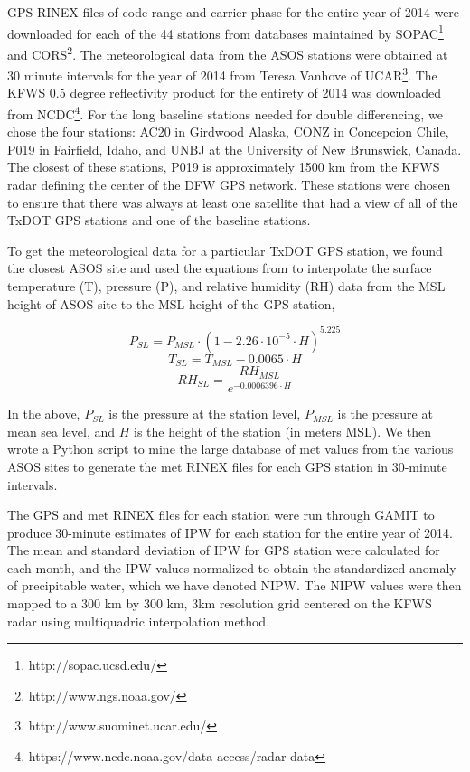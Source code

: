 \documentclass[proposal]{umassthesis}
\begin{document}
GPS RINEX files of code range and carrier phase for the entire year of 2014 were downloaded for each of the 44 stations from databases maintained by SOPAC\footnote{http://sopac.ucsd.edu/} \cite{bock1997scripps} and CORS\footnote{http://www.ngs.noaa.gov/}\cite{snay2008continuously}. The meteorological data from the ASOS stations were obtained at 30 minute intervals for the year of 2014 from Teresa Vanhove of UCAR\footnote{http://www.suominet.ucar.edu/}. The KFWS 0.5 degree reflectivity product for the entirety of 2014 was downloaded from NCDC\footnote{https://www.ncdc.noaa.gov/data-access/radar-data}. For the long baseline stations needed for double differencing, we chose the four stations: AC20 in Girdwood Alaska, CONZ in Concepcion Chile, P019 in Fairfield, Idaho, and UNBJ at the University of New Brunswick, Canada. The closest of these stations, P019 is approximately 1500 km from the KFWS radar defining the center of the DFW GPS network. These stations were chosen to ensure that there was always at least one satellite that had a view of all of the TxDOT GPS stations and one of the baseline stations.

To get the meteorological data for a particular TxDOT GPS station, we found the closest ASOS site and used the equations from \cite{bai2003gps} to interpolate the surface temperature (T), pressure (P), and relative humidity (RH) data from the MSL height of ASOS site to the MSL height of the GPS station,
 
\begin{equation}
P_{SL} = P_{MSL} \cdot (1 - 2.26 \cdot 10^{-5} \cdot H)^{5.225}
\end{equation}
\begin{equation}
T_{SL} = T_{MSL} - 0.0065 \cdot H
\end{equation}
\begin{equation}
RH_{SL} = \dfrac{RH_{MSL}}{e^{-0.0006396 \cdot H}}
\end{equation}

In the above, $P_{SL}$ is the pressure at the station level, $P_{MSL}$ is the pressure at mean sea level, and $H$ is the height of the station (in meters MSL). We then wrote a Python script to mine the large database of met values from the various ASOS sites to generate the met RINEX files for each GPS station in 30-minute intervals. 

The GPS and met RINEX files for each station were run through GAMIT to produce 30-minute estimates of IPW for each station for the entire year of 2014. The mean and standard deviation of IPW for GPS station were calculated for each month, and the IPW values normalized to obtain the standardized anomaly of precipitable water, which we have denoted NIPW. The NIPW values were then mapped to a 300 km by 300 km, 3km resolution grid centered on the KFWS radar using multiquadric interpolation method.
\end{document}
